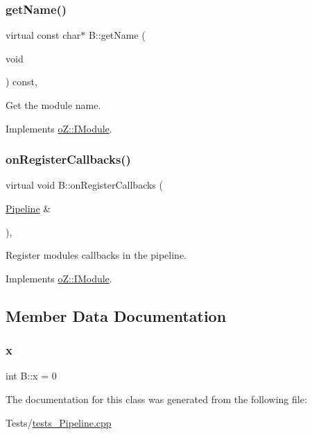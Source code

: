 \subsubsection{\texorpdfstring{getName()}{getName()}}
{\footnotesize\ttfamily virtual const char$\ast$ B\+::get\+Name (\begin{DoxyParamCaption}\item[{void}]{ }\end{DoxyParamCaption}) const\hspace{0.3cm}{\ttfamily [inline]}, {\ttfamily [virtual]}}



Get the module name. 



Implements \mbox{\hyperlink{classo_z_1_1_i_module_af41d45158fd28e1bd86a34e25f5282d6}{o\+Z\+::\+I\+Module}}.

\mbox{\label{class_b_a681f13a5b7d401fe80a18b63f90b0f89}} 
\subsubsection{\texorpdfstring{onRegisterCallbacks()}{onRegisterCallbacks()}}
{\footnotesize\ttfamily virtual void B\+::on\+Register\+Callbacks (\begin{DoxyParamCaption}\item[{\mbox{\hyperlink{classo_z_1_1_pipeline}{Pipeline}} \&}]{ }\end{DoxyParamCaption})\hspace{0.3cm}{\ttfamily [inline]}, {\ttfamily [virtual]}}



Register module\textquotesingle{}s callbacks in the pipeline. 



Implements \mbox{\hyperlink{classo_z_1_1_i_module_a3dc905faa6df5e22eecc6ffbc923fd95}{o\+Z\+::\+I\+Module}}.



\subsection{Member Data Documentation}
\mbox{\label{class_b_aa91b82708e65dd6d4c87622c510699cb}} 
\subsubsection{\texorpdfstring{x}{x}}
{\footnotesize\ttfamily int B\+::x = 0}



The documentation for this class was generated from the following file\+:\begin{DoxyCompactItemize}
\item 
Tests/\mbox{\hyperlink{tests___pipeline_8cpp}{tests\+\_\+\+Pipeline.\+cpp}}\end{DoxyCompactItemize}
